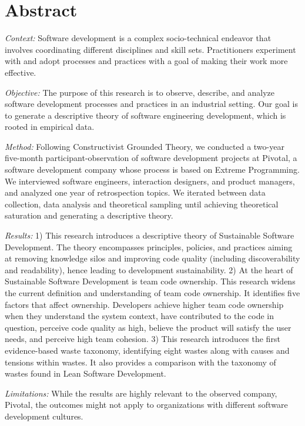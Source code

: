 
\newpage
\section*{Abstract}
\textit{Context:} Software development is a complex socio-technical endeavor that involves coordinating different disciplines and skill sets. Practitioners experiment with and adopt processes and practices with a goal of making their work more effective.

\textit{Objective:} The purpose of this research is to observe, describe, and analyze software development processes and practices in an industrial setting. Our goal is to generate a descriptive theory of software engineering development, which is rooted in empirical data.

\textit{Method:} Following Constructivist Grounded Theory, we conducted a two-year five-month participant-observation of \numberOfObservedProjects{} software development projects at Pivotal, a software development company whose process is based on Extreme Programming. We interviewed \numberOfInterviews{} software engineers, interaction designers, and product managers, and analyzed one year of retrospection topics. We iterated between data collection, data analysis and theoretical sampling until achieving theoretical saturation and generating a descriptive theory.

\textit{Results:} 1) This research introduces a descriptive theory of Sustainable Software Development. The theory encompasses principles, policies, and practices aiming at removing knowledge silos and improving code quality (including discoverability and readability), hence leading to development sustainability. 2) At the heart of Sustainable Software Development is team code ownership. This research widens the current definition and understanding of team code ownership. It identifies five factors that affect ownership. Developers achieve higher team code ownership when they understand the system context, have contributed to the code in question, perceive code quality as high, believe the product will satisfy the user needs, and perceive high team cohesion. 3) This research introduces the first evidence-based waste taxonomy, identifying eight wastes along with causes and tensions within wastes. It also provides a comparison with the taxonomy of wastes found in Lean Software Development.

\textit{Limitations:} While the results are highly relevant to the observed company, Pivotal, the outcomes might not apply to organizations with different software development cultures.

